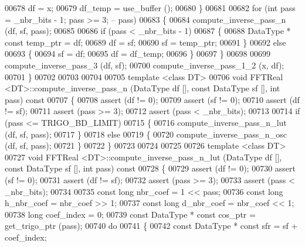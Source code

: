 \begin{DoxyCode}
00678         df = x;
00679         df\_temp = use\_buffer ();
00680     \}
00681 
00682     \textcolor{keywordflow}{for} (\textcolor{keywordtype}{int} pass = \_nbr\_bits - 1; pass >= 3; -- pass)
00683     \{
00684         compute\_inverse\_pass\_n (df, sf, pass);
00685 
00686         \textcolor{keywordflow}{if} (pass < \_nbr\_bits - 1)
00687         \{
00688             DataType    * \textcolor{keyword}{const} temp\_ptr = df;
00689             df = sf;
00690             sf = temp\_ptr;
00691         \}
00692         \textcolor{keywordflow}{else}
00693         \{
00694             sf = df;
00695             df = df\_temp;
00696         \}
00697     \}
00698 
00699     compute\_inverse\_pass\_3 (df, sf);
00700     compute\_inverse\_pass\_1\_2 (x, df);
00701 \}
00702 
00703 
00704 
00705 \textcolor{keyword}{template} <\textcolor{keyword}{class} DT>
00706 \textcolor{keywordtype}{void}    FFTReal <DT>::compute\_inverse\_pass\_n (DataType df [], \textcolor{keyword}{const} DataType sf [], \textcolor{keywordtype}{int} pass) \textcolor{keyword}{const}
00707 \{
00708     assert (df != 0);
00709     assert (sf != 0);
00710     assert (df != sf);
00711     assert (pass >= 3);
00712     assert (pass < \_nbr\_bits);
00713 
00714     \textcolor{keywordflow}{if} (pass <= TRIGO\_BD\_LIMIT)
00715     \{
00716         compute\_inverse\_pass\_n\_lut (df, sf, pass);
00717     \}
00718     \textcolor{keywordflow}{else}
00719     \{
00720         compute\_inverse\_pass\_n\_osc (df, sf, pass);
00721     \}
00722 \}
00723 
00724 
00725 
00726 \textcolor{keyword}{template} <\textcolor{keyword}{class} DT>
00727 \textcolor{keywordtype}{void}    FFTReal <DT>::compute\_inverse\_pass\_n\_lut (DataType df [], \textcolor{keyword}{const} DataType sf [], \textcolor{keywordtype}{int} pass) \textcolor{keyword}{const}
00728 \{
00729     assert (df != 0);
00730     assert (sf != 0);
00731     assert (df != sf);
00732     assert (pass >= 3);
00733     assert (pass < \_nbr\_bits);
00734 
00735     \textcolor{keyword}{const} \textcolor{keywordtype}{long}      nbr\_coef = 1 << pass;
00736     \textcolor{keyword}{const} \textcolor{keywordtype}{long}      h\_nbr\_coef = nbr\_coef >> 1;
00737     \textcolor{keyword}{const} \textcolor{keywordtype}{long}      d\_nbr\_coef = nbr\_coef << 1;
00738     \textcolor{keywordtype}{long}                coef\_index = 0;
00739     \textcolor{keyword}{const} DataType * \textcolor{keyword}{const}  cos\_ptr = get\_trigo\_ptr (pass);
00740     \textcolor{keywordflow}{do}
00741     \{
00742         \textcolor{keyword}{const} DataType  * \textcolor{keyword}{const} sfr = sf + coef\_index;

\end{DoxyCode}
